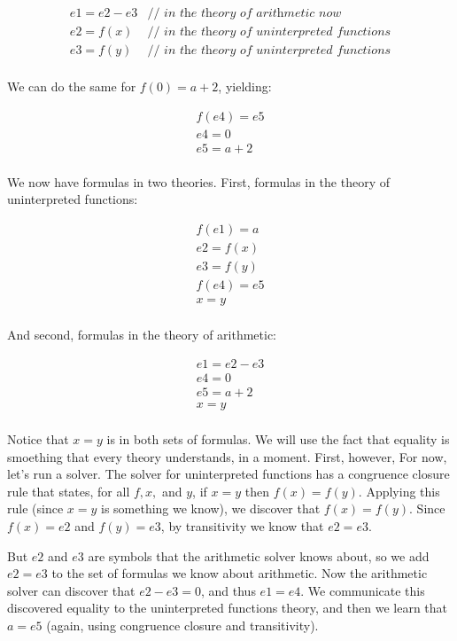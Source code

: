 \documentclass[11pt]{article}
\begin{document}
\[
\begin{array}{ll}
e1 = e2 - e3    & \textit{// in the theory of arithmetic now} \\
e2 = f(x)       & \textit{// in the theory of uninterpreted functions} \\
e3 = f(y)       & \textit{// in the theory of uninterpreted functions} \\
\end{array}
\]

We can do the same for $f(0) = a+2$, yielding:

\[
\begin{array}{l}
f(e4) = e5 \\
e4 = 0 \\
e5 = a + 2 \\
\end{array}
\]

We now have formulas in two theories. First, formulas in the theory of
uninterpreted functions:

\[
\begin{array}{l}
f(e1) = a \\
e2 = f(x) \\
e3 = f(y) \\
f(e4) = e5 \\
x = y \\
\end{array}
\]

And second, formulas in the theory of arithmetic:

\[
\begin{array}{l}
e1 = e2 - e3 \\
e4 = 0 \\
e5 = a + 2 \\
x = y \\
\end{array}
\]

Notice that $x = y$ is in both sets of formulas. We will use the fact that
equality is smoething that every theory understands, in a moment. First,
however, For now, let's run a solver. The solver for uninterpreted functions has
a congruence closure rule that states, for all $f, x,$ and $y$, if $x = y$ then
$f(x) = f(y)$. Applying this rule (since $x=y$ is something we know), we
discover that $f(x) = f(y)$. Since $f(x) = e2$ and $f(y) = e3$, by transitivity
we know that $e2 = e3$.

But $e2$ and $e3$ are symbols that the arithmetic solver knows about, so we add
$e2=e3$ to the set of formulas we know about arithmetic. Now the arithmetic
solver can discover that $e2-e3 = 0$, and thus $e1 = e4$. We communicate this
discovered equality to the uninterpreted functions theory, and then we learn
that $a = e5$ (again, using congruence closure and transitivity).
\end{document}
